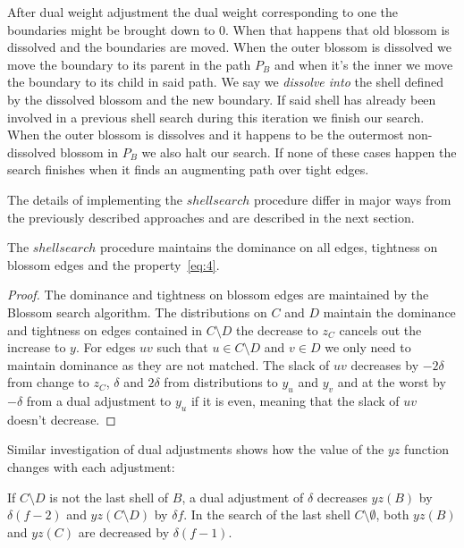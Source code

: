 After dual weight adjustment the dual weight corresponding to one the boundaries might be brought down to $0$. When that happens that old blossom is dissolved and the boundaries are moved. When the outer blossom is dissolved we move the boundary to its parent in the path $P_B$ and when it's the inner we move the boundary to its child in said path. We say we \textit{dissolve into} the shell defined by the dissolved blossom and the new boundary. If said shell has already been involved in a previous shell search during this iteration we finish our search. When the outer blossom is dissolves and it happens to be the outermost non-dissolved blossom in $P_B$ we also halt our search. If none of these cases happen the search finishes when it finds an augmenting path over tight edges.

The details of implementing the $shellsearch$ procedure differ in major ways from the previously described approaches and are described in the next section.

\begin{lemma}\label{lem:search_correctness}
    The $shellsearch$ procedure maintains the dominance on all edges, tightness on blossom edges and the property~\ref{eq:4}.
\end{lemma}

\begin{proof}
    The dominance and tightness on blossom edges are maintained by the Blossom search algorithm. The distributions on $C$ and $D$ maintain the dominance and tightness on edges contained in $C \setminus D$ the decrease to $z_C$ cancels out the increase to $y$. For edges $uv$ such that $u \in C \setminus D$ and $v \in D$ we only need to maintain dominance as they are not matched. The slack of $uv$ decreases by $-2\delta$ from change to $z_C$, $\delta$ and $2\delta$ from distributions to $y_u$ and $y_v$ and at the worst by $-\delta$ from a dual adjustment to $y_u$ if it is even, meaning that the slack of $uv$ doesn't decrease.
\end{proof}

Similar investigation of dual adjustments shows how the value of the $yz$ function changes with each adjustment:

\begin{lemma}\label{lem:search_duals}
    If $C \setminus D$ is not the last shell of $B$, a dual adjustment of $\delta$ decreases $yz(B)$ by $\delta(f-2)$ and $yz(C \setminus D)$ by $\delta f$. In the search of the last shell $C \setminus \emptyset$, both $yz(B)$ and $yz(C)$ are decreased by $\delta(f-1)$.
\end{lemma}

